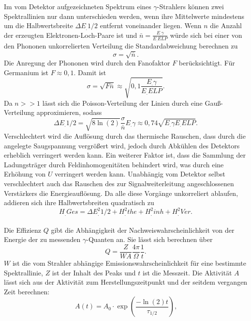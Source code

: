 Im vom Detektor aufgezeichneten Spektrum eines $\gamma$-Strahlers können zwei Spektrallinien nur dann unterschieden werden, wenn ihre Mittelwerte mindestens um die Halbwertsbreite $\Delta E_.{1/2}$ entfernt voneinander liegen.
Wenn $n$ die Anzahl der erzeugten Elektronen-Loch-Paare ist und $\bar{n}=\frac{E_.{\gamma}}{E_.{ELP}}$ würde sich bei einer von den Phononen unkorrelierten Verteilung die Standardabweichung berechnen zu
\[
\sigma=\sqrt{\bar{n}}\text{.}
\]
Die Anregung der Phononen wird durch den Fanofaktor $F$ berücksichtigt. Für Germanium ist $F\approx 0,1$.
Damit ist 
\[
\sigma=\sqrt{F\bar{n}}\approx\sqrt{0,1\frac{E_.{\gamma}}{E_.{ELP}}}\text{.}\label{eq:sig}
\]
Da $n>>1$ lässt sich die Poisson-Verteilung der Linien durch eine Gauß-Verteilung approximieren, sodass
\begin{equation}
\Delta E_.{1/2}=\sqrt{8\ln(2)}\frac{\sigma}{\bar{n}}E_.{\gamma}\approx 0,74\sqrt{E_.{\gamma}E_.{ELP}}\text{.}\label{eq:dE}
\end{equation}
Verschlechtert wird die Auflösung durch das thermische Rauschen, dass durch die angelegte Saugspannung vergrößert wird, jedoch durch Abkühlen des Detektors erheblich verringert werden kann. Ein weiterer Faktor ist, dass die Sammlung der Ladungsträger durch Feldinhomogenitäten behindert wird, was durch eine Erhöhung von $U$ verringert werden kann. Unabhängig vom Detektor selbst verschlechtert auch das Rauschen des zur Signalweiterleitung angeschlossenen Verstärkers die Energieauflösung. Da alle diese Vorgänge unkorreliert ablaufen, addieren sich ihre Halbwertsbreiten quadratisch zu
\begin{equation}
H_.{Ges}=\Delta E^2_.{1/2} + H^2_.{the} + H^2_.{inh} + H^2_.{Ver}\text{.}\label{eq:HGes}
\end{equation}
\\
Die Effizienz $Q$ gibt die Abhängigkeit der Nachweiswahrscheinlichkeit von der Energie der zu messenden $\gamma$-Quanten an.
Sie lässt sich berechnen über
\begin{equation}
Q=\frac{Z}{W A}\frac{4\pi}{\Omega}\frac{1}{t}\text{.}\label{eq:Q}
\end{equation}
$W$ ist die vom Strahler abhängige Emissionswahrscheinlichkeit für eine bestimmte Spektrallinie, $Z$ ist der Inhalt des Peaks und $t$ ist die Messzeit.
Die Aktivität $A$ lässt sich aus der Aktivität zum Herstellungszeitpunkt und der seitdem vergangen Zeit berechnen:
\begin{equation}
A(t) = A_0\cdot \exp\left(\frac{-\ln(2)t}{\tau_{1/2}}\right)\text{,}\label{eq:A} 
\end{equation}
